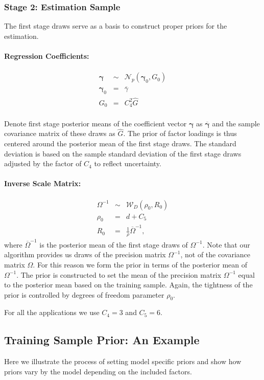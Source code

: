 \subsubsection{Stage 2: Estimation Sample}
The first stage draws serve as a basis to construct proper priors for the estimation.
\paragraph{Regression Coefficients:} 
\begin{eqnarray*}
	\boldsymbol{\gamma} &\sim& \mathcal{N}_{p}\left( \boldsymbol{\gamma}_{0},G_{0}\right) \\
	\boldsymbol{\gamma}_{0} &=& \overline{\gamma} \\ 
	G_{0} &=& C_{4}^{2} \widehat{G}
\end{eqnarray*}\\
Denote first stage posterior means of the coefficient vector $\boldsymbol{\gamma}$ as $\overline{\boldsymbol{\gamma}}$ and the sample covariance matrix of these draws as $\widehat{G}$.
The prior of factor loadings is thus centered around the posterior mean of the first stage draws. 
The standard deviation is based on the sample standard deviation of the first stage draws adjusted by the factor of $C_{4}$ to reflect uncertainty.
\paragraph{Inverse Scale Matrix:}
\begin{eqnarray*}
	\Omega^{-1} &\sim& \mathcal{W}_D\left(\rho_0, R_{0}\right) \\
	\rho_{0} &=& d + C_{5} \\ 
	R_{0} &=& \frac{1}{\rho} \overline{\Omega}^{-1},
\end{eqnarray*} 
where $\overline{\Omega}^{-1}$ is the posterior mean of the first stage draws of $\Omega^{-1}$.
Note that our algorithm provides us draws of the precision matrix $\Omega^{-1}$, not of the covariance matrix $\Omega$. 
For this reason we form the prior in terms of the posterior mean of ${\Omega}^{-1}$. 
The prior is constructed to set the mean of the precision matrix $\Omega^{-1}$ equal to the posterior mean based on the training sample. 
Again, the tightness of the prior is controlled by degrees of freedom parameter $\rho_{0}$. 

For all the applications we use $C_{4} = 3$ and $C_5 = 6$.

\subsection{Training Sample Prior: An Example}
Here we illustrate the process of setting model specific priors and show how priors vary by the model depending on the included factors.

